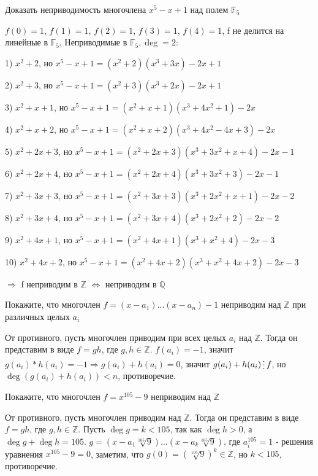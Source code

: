 \documentclass[12pt]{article}
\newenvironment{problem}[2][Problem]
{\begin{trivlist}\item[{\bfseries #1} {\bfseries #2.}]}{\end{trivlist}}
\newenvironment{solutions}[2][Solutions]
{\begin{trivlist}\item[{\bfseries #1} {\bfseries #2.}]}{\end{trivlist}}
\begin{document}
\begin{problem}{4} 
Доказать неприводимость многочлена $x^5-x+1$ над полем $\mathds{F}_5$
\end{problem}

\begin{solutions}{4} 
$f(0)=1$, $f(1)=1$, $f(2)=1$, $f(3)=1$, $f(4)=1$, f не делится на линейные в $\mathds{F}_5$, Неприводимые в $\mathds{F}_5, \deg = 2$: 

1) $x^2+2$, но $x^5-x+1 = (x^2+2)(x^3+3x) -2x+1$

2) $x^2+3$, но $x^5-x+1 = (x^2+3)(x^3+2x) -2x+1$

3) $x^2+x+1$, но $x^5-x+1 = (x^2+x+1)(x^3+4x^2+1) -2x $

4) $x^2+x+2$, но $x^5-x+1 = (x^2+x+2)(x^3+4x^2-4x+3) -2x$

5) $x^2+2x+3$, но $x^5-x+1 = (x^2+2x+3)(x^3+3x^2+x+4) -2x-1$

6) $x^2+2x+4$, но $x^5-x+1 = (x^2+2x+4)(x^3+3x^2+3) -2x-1$

7) $x^2+3x+3$, но $x^5-x+1 = (x^2+3x+3)(x^3+2x^2+x+1) -2x-2$

8) $x^2+3x+4$, но $x^5-x+1 = (x^2+3x+4)(x^3+2x^2+2) -2x-2$

9) $x^2+4x+1$, но $x^5-x+1 = (x^2+4x+1)(x^3+x^2+4) -2x-3$

10) $x^2+4x+2$, но $x^5-x+1 = (x^2+4x+2)(x^3+x^2+4x+2) -2x-3$

$\Rightarrow$ f неприводим в $\mathds{Z}$ $\Leftrightarrow$ неприводим в $\mathds{Q}$
\end{solutions}

\begin{problem}{5} 
Покажите, что многочлен $f=(x-a_1)...(x-a_n) - 1$ неприводим над $\mathds{Z}$ при различных целых $a_i$
\end{problem}

\begin{solutions}{5} 
От противного, пусть многочлен приводим при всех целых $a_i$ над $\mathds{Z}$. Тогда он представим в виде $f=g h$, где $g,h\in\mathds{Z}$. $f(a_i)=-1$, значит $g(a_i)*h(a_i)=-1 \Rightarrow g(a_i)+h(a_i)=0$, значит $g(a_i)+h(a_i) \mathop{\raisebox{-2pt}{\vdots}} f$, но $\deg (g(a_i)+h(a_i)) < n$, противоречие.
\end{solutions}

\begin{problem}{6} 
Покажите, что многочлен $f=x^{105}-9$ неприводим над $\mathds{Z}$
\end{problem}

\begin{solutions}{6} 
От противного, пусть многочлен приводим над $\mathds{Z}$. Тогда он представим в виде $f=g h$, где $g,h\in\mathds{Z}$. Пусть $\deg g = k < 105$, так как $\deg h > 0$, а $\deg g + \deg h = 105$. $g=(x-a_1\sqrt[105]{9})...(x-a_k\sqrt[105]{9})$, где $a_i^{105} = 1$ - решения уравнения $x^{105}-9=0$, заметим, что $g(0)=(\sqrt[105]{9})^k\in\mathds{Z}$, но $k<105$, противоречие.
\end{solutions}
\end{document}
